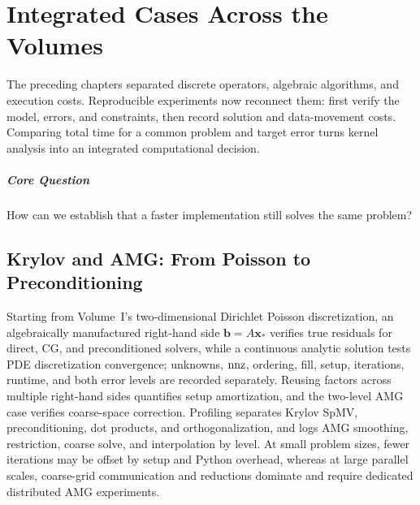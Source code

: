 \chapter{Integrated Cases Across the Volumes}\label{v0ch:29}
\begin{chaptersummary}
The preceding chapters separated discrete operators, algebraic algorithms, and execution costs. Reproducible experiments now reconnect them: first verify the model, errors, and constraints, then record solution and data-movement costs. Comparing total time for a common problem and target error turns kernel analysis into an integrated computational decision.
\end{chaptersummary}
\paragraph{Core Question}How can we establish that a faster implementation still solves the same problem?

\section{Krylov and AMG: From Poisson to Preconditioning}
Starting from Volume~I's two-dimensional Dirichlet Poisson discretization, an algebraically manufactured right-hand side $\bm b=A\bm x_*$ verifies true residuals for direct, CG, and preconditioned solvers, while a continuous analytic solution tests PDE discretization convergence; unknowns, $\operatorname{nnz}$, ordering, fill, setup, iterations, runtime, and both error levels are recorded separately. Reusing factors across multiple right-hand sides quantifies setup amortization, and the two-level AMG case verifies coarse-space correction.
Profiling separates Krylov SpMV, preconditioning, dot products, and orthogonalization, and logs AMG smoothing, restriction, coarse solve, and interpolation by level. At small problem sizes, fewer iterations may be offset by setup and Python overhead, whereas at large parallel scales, coarse-grid communication and reductions dominate and require dedicated distributed AMG experiments.

